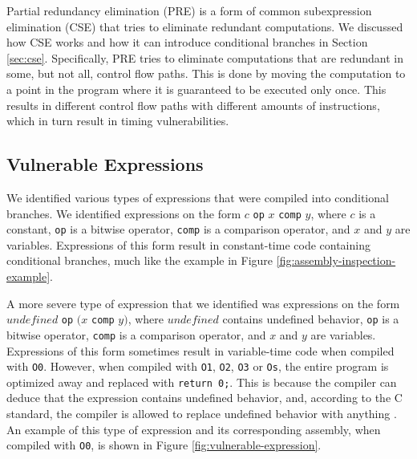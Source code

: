 Partial redundancy elimination (PRE) is a form of common subexpression elimination (CSE) that tries to eliminate redundant computations. 
We discussed how CSE works and how it can introduce conditional branches in Section \ref{sec:cse}.
Specifically, PRE tries to eliminate computations that are redundant in some, but not all, control flow paths.
This is done by moving the computation to a point in the program where it is guaranteed to be executed only once.
This results in different control flow paths with different amounts of instructions, which in turn result in timing vulnerabilities.

\subsection{Vulnerable Expressions}
We identified various types of expressions that were compiled into conditional branches.
We identified expressions on the form $c$ \texttt{op} $x$ \texttt{comp} $y$, where $c$ is a constant, \texttt{op} is a bitwise operator, \texttt{comp} is a comparison operator, and $x$ and $y$ are variables.
Expressions of this form result in constant-time code containing conditional branches, much like the example in Figure \ref{fig:assembly-inspection-example}.

A more severe type of expression that we identified was expressions on the form $undefined$ \texttt{op} $(x$ \texttt{comp} $y)$, where $undefined$ contains undefined behavior, \texttt{op} is a bitwise operator, \texttt{comp} is a comparison operator, and $x$ and $y$ are variables. 
Expressions of this form sometimes result in variable-time code when compiled with \texttt{O0}.
However, when compiled with \texttt{O1}, \texttt{O2}, \texttt{O3} or \texttt{Os}, the entire program is optimized away and replaced with \texttt{return 0;}.
This is because the compiler can deduce that the expression contains undefined behavior, and, according to the C standard, the compiler is allowed to replace undefined behavior with anything \citep{c-standard}.
An example of this type of expression and its corresponding assembly, when compiled with \texttt{O0}, is shown in Figure \ref{fig:vulnerable-expression}.


